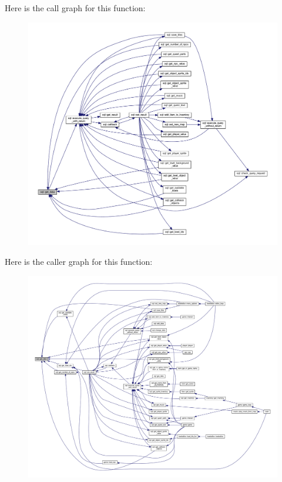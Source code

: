 Here is the call graph for this function\+:
\nopagebreak
\begin{figure}[H]
\begin{center}
\leavevmode
\includegraphics[width=350pt]{classsql_a1cb74ab7343ef603490518715297be83_cgraph}
\end{center}
\end{figure}
Here is the caller graph for this function\+:
\nopagebreak
\begin{figure}[H]
\begin{center}
\leavevmode
\includegraphics[width=350pt]{classsql_a1cb74ab7343ef603490518715297be83_icgraph}
\end{center}
\end{figure}
\mbox{\label{classsql_afbf7d36239ee07a23d06c72f2fd1b93c}} 
